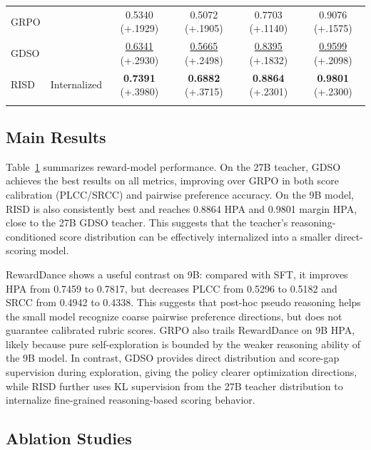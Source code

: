 \documentclass{article}
\newcommand{\tabyes}{\ding{51}}
\newcommand{\tabgain}[1]{\textcolor{gaincolor}{(+#1)}}
\newcommand{\teaname}{GDSO\xspace}
\newcommand{\stuname}{RISD\xspace}
\begin{document}
\begin{table}[t]
{\begin{tabular}{l c c c c c}
GRPO & \tabyes & 0.5340 \tabgain{.1929} & 0.5072 \tabgain{.1905} & 0.7703 \tabgain{.1140} & 0.9076 \tabgain{.1575} \\
\teaname & \tabyes & \underline{0.6341} \tabgain{.2930} & \underline{0.5665} \tabgain{.2498} & \underline{0.8395} \tabgain{.1832} & \underline{0.9599} \tabgain{.2098} \\
\rowcolor[RGB]{240,230,245}
\stuname & Internalized & \textbf{0.7391} \tabgain{.3980} & \textbf{0.6882} \tabgain{.3715} & \textbf{0.8864} \tabgain{.2301} & \textbf{0.9801} \tabgain{.2300} \\
\arrayrulecolor{black}\bottomrule
\end{tabular}%
}
\label{tab:reward_model_evaluation}
\end{table}

\subsection{Main Results}

Table~\ref{tab:reward_model_evaluation} summarizes reward-model performance. On the 27B teacher, \teaname achieves the best results on all metrics, improving over GRPO in both score calibration (PLCC/SRCC) and pairwise preference accuracy. On the 9B model, \stuname is also consistently best and reaches 0.8864 HPA and 0.9801 margin HPA, close to the 27B \teaname teacher. This suggests that the teacher's reasoning-conditioned score distribution can be effectively internalized into a smaller direct-scoring model.

RewardDance shows a useful contrast on 9B: compared with SFT, it improves HPA from 0.7459 to 0.7817, but decreases PLCC from 0.5296 to 0.5182 and SRCC from 0.4942 to 0.4338. This suggests that post-hoc pseudo reasoning helps the small model recognize coarse pairwise preference directions, but does not guarantee calibrated rubric scores. GRPO also trails RewardDance on 9B HPA, likely because pure self-exploration is bounded by the weaker reasoning ability of the 9B model. In contrast, \teaname provides direct distribution and score-gap supervision during exploration, giving the policy clearer optimization directions, while \stuname further uses KL supervision from the 27B teacher distribution to internalize fine-grained reasoning-based scoring behavior.

\subsection{Ablation Studies}
\end{document}
